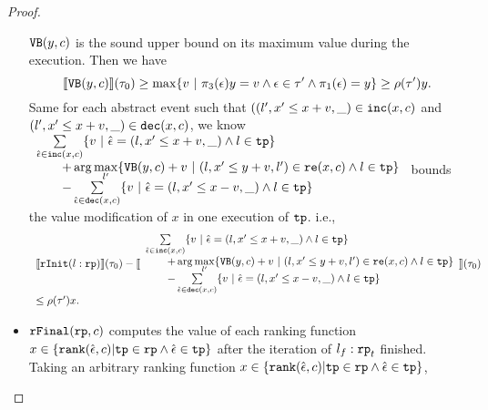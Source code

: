 \begin{proof}
\begin{itemize}
   ${\mathtt{VB}}(y, c)$ is the sound upper bound on its maximum value during the execution. 
   Then we have
   \[
     \econfig{\varinvar(y, c)}(\trace_0) \geq \max \left\{ v ~|~  \pi_3(\event) y = v \land \event \in \trace' \land \pi_1(\event) = y\right\}  \geq \env(\trace') y. 
   \]
   Same for each abstract event such that $((l', x' \leq x + v, \_) \in \mathtt{inc}(x, c) $ and $(l', x' \leq x + v, \_) \in \mathtt{dec}(x, c)$,
   we know 
   $      
   \begin{array}{l}
    \sum\limits_{\absevent \in \inc(x, c) }
     \left\{ v ~\middle\vert~ \absevent = (l, x' \leq x + v, \_) \land l \in \tpath\right\}
     \\ \qquad 
     + \arg\max\limits_{l' }
        \left\{ \varinvar(y, c) + v ~\middle\vert~ (l, x' \leq y + v, l') \in \reset(x, c) \land l \in \tpath\right\}
        \\ \qquad 
       - \sum\limits_{ \absevent \in \dec(x, c) }\left\{ 
         v ~\middle\vert~ \absevent = (l, x' \leq x - v, \_) \land l \in \tpath 
         \right\}
       \end{array}
   $ bounds the value modification of $x$ in one execution of $\mathtt{tp}$.
 i.e.,
   \[
     \begin{array}{l}
       \econfig{
       \rfinit(l: \rprog)}(\trace_0)
       -
     \econfig{
      \begin{array}{l}
        \sum\limits_{\absevent \in \inc(x, c) }
         \left\{ v ~\middle\vert~ \absevent = (l, x' \leq x + v, \_) \land l \in \tpath\right\}
         \\ \qquad 
         + \arg\max\limits_{l' }
            \left\{ \varinvar(y, c) + v ~\middle\vert~ (l, x' \leq y + v, l') \in \reset(x, c) \land l \in \tpath\right\}
            \\ \qquad 
           - \sum\limits_{ \absevent \in \dec(x, c) } \left\{ 
             v ~\middle\vert~ \absevent = (l, x' \leq x - v, \_) \land l \in \tpath 
             \right\}
           \end{array}
     }(\trace_0) \\
     \leq \env(\trace') x.
   \end{array}
   \]
 \item $\mathtt{rFinal}(\mathtt{rp}, c)$ computes the value of 
 each ranking function 
 $x \in \left\{ \locbound(\absevent, c) | \tpath \in \rprog \land \absevent \in \tpath \right\}$ after the iteration of $l_f:\mathtt{rp}_t$ finished.
 \\
 Taking an arbitrary ranking function $x \in \left\{ \locbound(\absevent, c) | \tpath \in \rprog \land \absevent \in \tpath \right\}$,

\end{itemize}
\end{proof}
